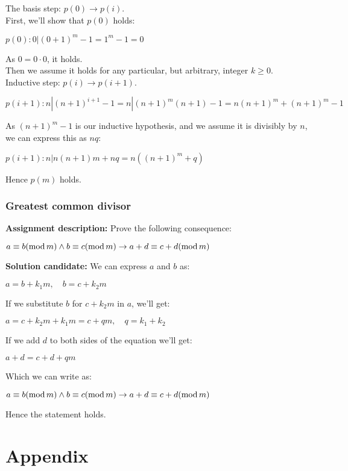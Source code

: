 \documentclass{report}
\newcommand{\cent}[1]{\begin{center}#1\end{center}}
\newcommand{\assignmentDescription}{\textbf{Assignment description: }}
\newcommand{\solution}{\textbf{Solution candidate: }}
\newcommand{\QED}{\boxed{}}
\newcommand{\modInline}{\text{mod\,}}
\begin{document}
	The basis step: $p(0) \to p(i)$.\\
	
	First, we'll show that $p(0)$ holds:
	
	\cent{$p(0) : 0 | (0 + 1)^m - 1 = 1^m - 1 = 0$}
	
	As $0 = 0 \cdot 0$, it holds.\\
	
	Then we assume it holds for any particular, but arbitrary, integer $k \geq 0$.\\
	
	Inductive step: $p(i) \to p(i+1)$.\\
	
	\cent{$p(i+1) : n | (n+1)^{i+1} - 1 = n | (n+1)^m(n+1) - 1 = n(n+1)^m + (n+1)^m - 1$}
	
	As $(n+1)^m -1$ is our inductive hypothesis, and we assume it is divisibly by $n$, we can express this as $nq$:
	
	\cent{$p(i+1) : n|n(n+1)m + nq = n((n+1)^m + q)$}
	
	Hence  $p(m)$ holds.\\
	\QED
	
	\subsection{Greatest common divisor}
	
	\assignmentDescription
	Prove the following consequence:
	
	\cent{$a \equiv b ( \modInline m) \wedge b \equiv c (\modInline m) \to a+d \equiv c + d (\modInline m)$}
	
	\solution
	We can express $a$ and $b$ as:
	
	\cent{$a = b+k_1m, \quad b = c + k_2m $}
	
	If we substitute $b$ for $c + k_2m $ in $a$, we'll get:
	
	\cent{$a = c+ k_2m + k_1m = c  +qm, \quad q = k_1 + k_2$}
	
	If we add $d$ to both sides of the equation we'll get:
	
	\cent{$a+d = c +d +qm$}
	
	Which we can write as:
	
	\cent{$a \equiv b ( \modInline m) \wedge b \equiv c (\modInline m) \to a+d \equiv c + d (\modInline m)$}
	
	Hence the statement holds.\\
	\QED
	\chapter{Appendix}
	\pagebreak
	
\end{document}
